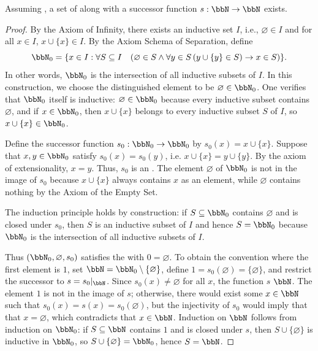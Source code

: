 \begin{proposition} \label{proposition:existence_of_natural_numbers_from_zf}
Assuming , a set of  along with a successor function $s: \bbN \to \bbN$ exists.
\end{proposition}

\begin{proof}
By the Axiom of Infinity, there exists an inductive set $I$, i.e., $\varnothing \in I$ and for all $x \in I$, $x \cup \{x\} \in I$. By the Axiom Schema of Separation, define
$$\bbN_0 = \{x \in I : \forall S \subseteq I \quad (\varnothing \in S \wedge \forall y \in S \, (y \cup \{y\} \in S) \rightarrow x \in S)\}.$$
In other words, $\bbN_0$ is the intersection of all inductive subsets of $I$. In this construction, we choose the distinguished element to be $\varnothing \in \bbN_0$. One verifies that $\bbN_0$ itself is inductive: $\varnothing \in \bbN_0$ because every inductive subset contains $\varnothing$, and if $x \in \bbN_0$, then $x \cup \{x\}$ belongs to every inductive subset $S$ of $I$, so $x \cup \{x\} \in \bbN_0$.

Define the successor function $s_0: \bbN_0 \to \bbN_0$ by $s_0(x) = x \cup \{x\}$. Suppose that $x,y \in \bbN_0$ satisfy $s_0(x) = s_0(y)$, i.e. $x \cup \{x\} = y \cup \{y\}$. By the axiom of extensionality, $x = y$. Thus, $s_0$ is an . The element $\varnothing$ of $\bbN_0$ is not in the image of $s_0$ because $x \cup \{x\}$ always contains $x$ as an element, while $\varnothing$ contains nothing by the Axiom of the Empty Set.

The induction principle holds by construction: if $S \subseteq \bbN_0$ contains $\varnothing$ and is closed under $s_0$, then $S$ is an inductive subset of $I$ and hence $S = \bbN_0$ because $\bbN_0$ is the intersection of all inductive subsets of $I$.

Thus $(\bbN_0, \varnothing, s_0)$ satisfies the  with $0 = \varnothing$. To obtain the convention where the first element is $1$, set $\bbN = \bbN_0 \setminus \{\varnothing\}$, define $1 = s_0(\varnothing) = \{\varnothing\}$, and restrict the successor to $s = s_0|_{\bbN}$. Since $s_0(x) \neq \varnothing$ for all $x$, the function $s$  $\bbN$. The element $1$ is not in the image of $s$; otherwise, there would exist some $x \in \bbN$ such that $s_0(x) = s(x) = s_0(\varnothing)$, but the injectivity of $s_0$ would imply that that $x = \varnothing$, which contradicts that $x \in \bbN$. Induction on $\bbN$ follows from induction on $\bbN_0$: if $S \subseteq \bbN$ contains $1$ and is closed under $s$, then $S \cup \{\varnothing\}$ is inductive in $\bbN_0$, so $S \cup \{\varnothing\} = \bbN_0$, hence $S = \bbN$.
\end{proof}
